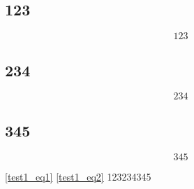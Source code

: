 
\subsection{123}
\begin{equation}
123
\end{equation}

\subsection{234}
\begin{equation}\label{test1_eq2}
234
\end{equation}

\subsection{345}
\begin{equation}\label{test1_eq1}
345
\end{equation}

\autoref{test1_eq1} \autoref{test1_eq2} 123234345
